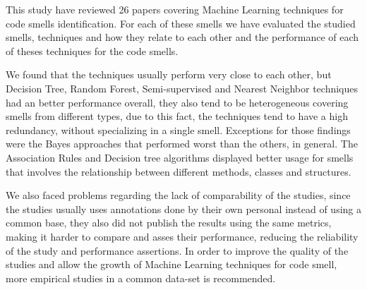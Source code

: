 
This study have reviewed 26 papers covering Machine Learning techniques for code smells identification. For each of these smells we have evaluated the studied smells, techniques and how they relate to each other and the performance of each of theses techniques for the code smells.

We found that the techniques usually perform very close to each other, but Decision Tree, Random Forest, Semi-supervised and Nearest Neighbor techniques had an better performance overall, they also tend to be heterogeneous covering smells from different types, due to this fact, the techniques tend to have a high redundancy, without specializing in a single smell. Exceptions for those findings were the Bayes approaches that performed worst than the others, in general. The Association Rules and Decision tree algorithms displayed better usage for smells that involves the relationship between different methods, classes and structures.

We also faced problems regarding the lack of comparability of the studies, since the studies usually uses annotations done by their own personal instead of using a common base, they also did not publish the results using the same metrics, making it harder to compare and asses their performance, reducing the reliability of the study and performance assertions. In order to improve the quality of the studies and allow the growth of Machine Learning techniques for code smell, more empirical studies in a common data-set is recommended.